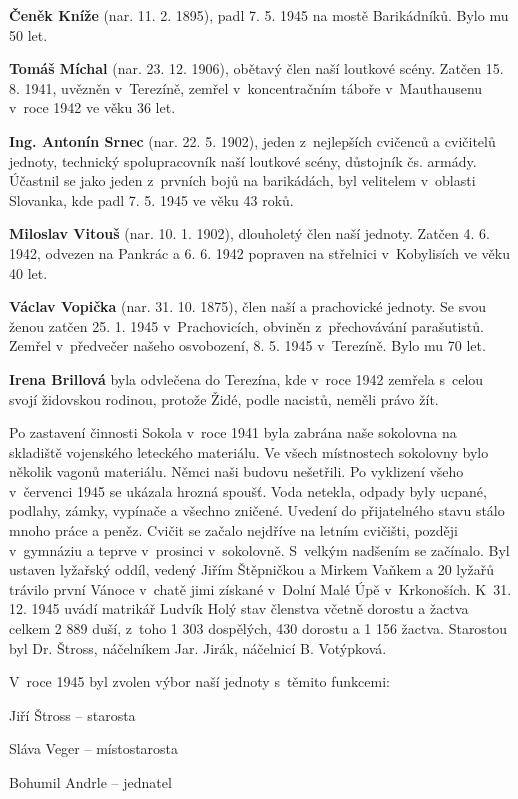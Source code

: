 \documentclass[a5paper, 11pt, twoside]{article}
\begin{document}
\textbf{Čeněk Kníže} (nar. 11. 2. 1895), padl 7. 5. 1945 na mostě
Barikádníků. Bylo mu 50 let.

\textbf{Tomáš Míchal} (nar. 23. 12. 1906), obětavý člen naší loutkové
scény. Zatčen 15. 8. 1941, uvězněn v~Terezíně, zemřel v~koncentračním
táboře v~Mauthausenu v~roce 1942 ve věku 36 let.

\textbf{Ing. Antonín Srnec} (nar. 22. 5. 1902), jeden z~nejlepších
cvičenců a cvičitelů jednoty, technický spolupracovník naší loutkové
scény, důstojník čs. armády. Účastnil se jako jeden z~prvních bojů na
barikádách, byl velitelem v~oblasti Slovanka, kde padl 7. 5. 1945 ve
věku 43 roků.

\textbf{Miloslav Vitouš} (nar. 10. 1. 1902), dlouholetý člen naší
jednoty. Zatčen 4. 6. 1942, odvezen na Pankrác a 6. 6. 1942 popraven na
střelnici v~Kobylisích ve věku 40 let.

\textbf{Václav Vopička} (nar. 31. 10. 1875), člen naší a prachovické
jednoty. Se svou ženou zatčen 25. 1. 1945 v~Prachovicích, obviněn
z~přechovávání parašutistů. Zemřel v~předvečer našeho osvobození, 8. 5.
1945 v~Terezíně. Bylo mu 70 let.

\textbf{Irena Brillová} byla odvlečena do Terezína, kde v~roce 1942
zemřela s~celou svojí židovskou rodinou, protože Židé, podle nacistů,
neměli právo žít.

Po zastavení činnosti Sokola v~roce 1941 byla zabrána naše sokolovna na
skladiště vojenského leteckého materiálu. Ve všech místnostech sokolovny
bylo několik vagonů materiálu. Němci naši budovu nešetřili. Po vyklizení
všeho v~červenci 1945 se ukázala hrozná spoušť. Voda netekla, odpady
byly ucpané, podlahy, zámky, vypínače a všechno zničené. Uvedení do
přijatelného stavu stálo mnoho práce a peněz. Cvičit se začalo nejdříve
na letním cvičišti, později v~gymnáziu a teprve v~prosinci v~sokolovně.
S~velkým nadšením se začínalo. Byl ustaven lyžařský oddíl, vedený Jiřím
Štěpničkou a Mirkem Vaňkem a 20 lyžařů trávilo první Vánoce v~chatě jimi
získané v~Dolní Malé Úpě v~Krkonoších. K~31. 12. 1945 uvádí matrikář
Ludvík Holý stav členstva včetně dorostu a žactva celkem 2 889 duší,
z~toho 1 303 dospělých, 430 dorostu a 1 156 žactva. Starostou byl Dr.
Štross, náčelníkem Jar. Jirák, náčelnicí B. Votýpková.

V~roce 1945 byl zvolen výbor naší jednoty s~těmito funkcemi:

Jiří Štross -- starosta

Sláva Veger -- místostarosta

Bohumil Andrle -- jednatel
\end{document}
